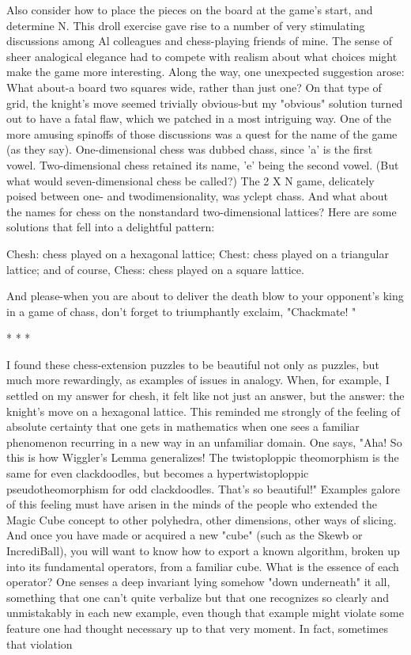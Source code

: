 Also consider how to place the pieces on the board at the game's start, and determine
N. This droll exercise gave rise to a number of very stimulating discussions among Al
colleagues and chess-playing friends of mine. The sense of sheer analogical elegance
had to compete with realism about what choices might make the game more
interesting. Along the way, one unexpected suggestion arose: What about-a board two
squares wide, rather than just one? On that type of grid, the knight's move seemed
trivially obvious-but my "obvious" solution turned out to have a fatal flaw, which we
patched in a most intriguing way.
One of the more amusing spinoffs of those discussions was a quest for the name of the
game (as they say). One-dimensional chess was dubbed chass, since 'a' is the first
vowel. Two-dimensional chess retained its name, 'e' being the second vowel. (But
what would seven-dimensional chess be called?) The 2 X N game, delicately poised
between one- and twodimensionality, was yclept chass. And what about the names for
chess on the nonstandard two-dimensional lattices? Here are some solutions that fell
into a delightful pattern:

       Chesh: chess played on a hexagonal lattice;
       Chest: chess played on a triangular lattice; and of course,
       Chess: chess played on a square lattice.

And please-when you are about to deliver the death blow to your opponent's king in a
game of chass, don't forget to triumphantly exclaim, "Chackmate! "

                                       *   *   *

        I found these chess-extension puzzles to be beautiful not only as puzzles, but
much more rewardingly, as examples of issues in analogy. When, for example, I
settled on my answer for chesh, it felt like not just an answer, but the answer: the
knight's move on a hexagonal lattice. This reminded me strongly of the feeling of
absolute certainty that one gets in mathematics when one sees a familiar phenomenon
recurring in a new way in an unfamiliar domain. One says, "Aha! So this is how
Wiggler's Lemma generalizes! The twistoploppic theomorphism is the same for even
clackdoodles, but becomes a hypertwistoploppic pseudotheomorphism for odd
clackdoodles. That's so beautiful!"
        Examples galore of this feeling must have arisen in the minds of the people
who extended the Magic Cube concept to other polyhedra, other dimensions, other
ways of slicing. And once you have made or acquired a new "cube" (such as the
Skewb or IncrediBall), you will want to know how to export a known algorithm,
broken up into its fundamental operators, from a familiar cube. What is the essence of
each operator? One senses a deep invariant lying somehow "down underneath" it all,
something that one can't quite verbalize but that one recognizes so clearly and
unmistakably in each new example, even though that example might violate some
feature one had thought necessary up to that very moment. In fact, sometimes that
violation





